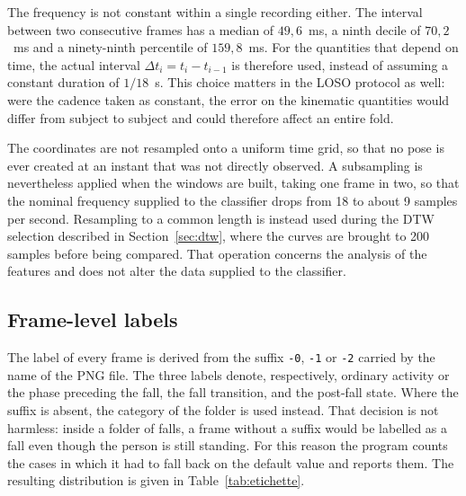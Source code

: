The frequency is not constant within a single recording either. The interval between two consecutive frames has a median of $49{,}6$~ms, a ninth decile of $70{,}2$~ms and a ninety-ninth percentile of $159{,}8$~ms. For the quantities that depend on time, the actual interval $\Delta t_i=t_i-t_{i-1}$ is therefore used, instead of assuming a constant duration of $1/18$~s. This choice matters in the LOSO protocol as well: were the cadence taken as constant, the error on the kinematic quantities would differ from subject to subject and could therefore affect an entire fold.

The coordinates are not resampled onto a uniform time grid, so that no pose is ever created at an instant that was not directly observed. A subsampling is nevertheless applied when the windows are built, taking one frame in two, so that the nominal frequency supplied to the classifier drops from 18 to about 9 samples per second. Resampling to a common length is instead used during the DTW selection described in Section~\ref{sec:dtw}, where the curves are brought to 200 samples before being compared. That operation concerns the analysis of the features and does not alter the data supplied to the classifier.

\subsection{Frame-level labels}

The label of every frame is derived from the suffix \texttt{-0}, \texttt{-1} or \texttt{-2} carried by the name of the PNG file. The three labels denote, respectively, ordinary activity or the phase preceding the fall, the fall transition, and the post-fall state. Where the suffix is absent, the category of the folder is used instead. That decision is not harmless: inside a folder of falls, a frame without a suffix would be labelled as a fall even though the person is still standing. For this reason the program counts the cases in which it had to fall back on the default value and reports them. The resulting distribution is given in Table~\ref{tab:etichette}.

\begin{table}[ht]
\centering
\caption{Distribution of the frame-level labels over the 220 recordings used.}
\label{tab:etichette}
\end{table}

